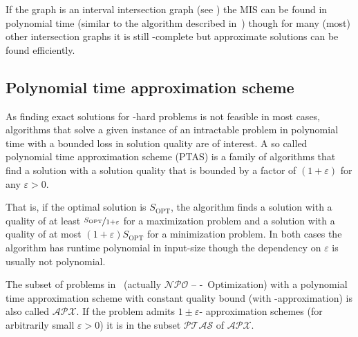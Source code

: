 If the graph is an interval intersection graph (see ) the MIS can be found in polynomial time (similar to the algorithm described in~) though for many (most) other intersection graphs it is still \NP-complete but approximate solutions can be found efficiently.


\subsection{Polynomial time approximation scheme}
As finding exact solutions for \NP-hard problems is not feasible in most cases, algorithms that solve a given instance of an intractable problem in polynomial time with a bounded loss in solution quality are of interest. A so called polynomial time approximation scheme (PTAS) is a family of algorithms that find a solution with a solution quality that is bounded by a factor of $(1+\varepsilon)$ for any $\varepsilon > 0$. %

That is, if the optimal solution is $S_\text{OPT}$, the algorithm finds a solution with a quality of at least $\nicefrac{S_\text{OPT}}{1+\varepsilon}$ for a maximization problem and a solution with a quality of at most $(1+\varepsilon)S_\text{OPT}$ for a minimization problem.
In both cases the algorithm has runtime polynomial in input-size though the dependency on $\varepsilon$ is usually not polynomial.

The subset of problems in \NP\ (actually $\mathcal{NPO}$ -- \NP-\ Optimization) with a polynomial time approximation scheme with constant quality bound (with -approximation) is also called $\mathcal{APX}$. If the problem admits $1\pm \varepsilon$- approximation schemes (for arbitrarily small $\varepsilon > 0$) it is in the subset $\mathcal{PTAS}$ of $\mathcal{APX}$.
